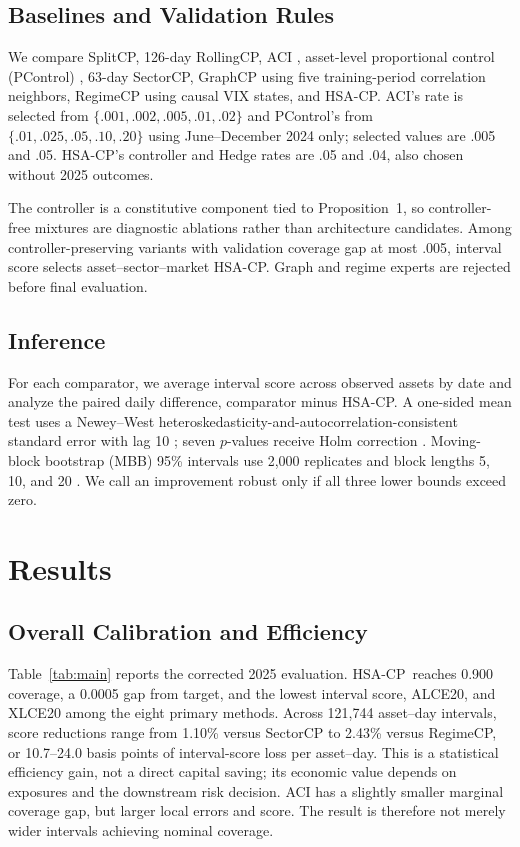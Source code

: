 \documentclass[conference]{IEEEtran}
\newcommand{\method}{HSA-CP}
\begin{document}
\subsection{Baselines and Validation Rules}

We compare SplitCP, 126-day RollingCP, ACI \cite{gibbs2021adaptive}, asset-level proportional control (PControl) \cite{angelopoulos2023pid}, 63-day SectorCP, GraphCP using five training-period correlation neighbors, RegimeCP using causal VIX states, and \method. ACI's rate is selected from $\{.001,.002,.005,.01,.02\}$ and PControl's from $\{.01,.025,.05,.10,.20\}$ using June--December 2024 only; selected values are .005 and .05. \method's controller and Hedge rates are .05 and .04, also chosen without 2025 outcomes.

The controller is a constitutive component tied to Proposition~1, so controller-free mixtures are diagnostic ablations rather than architecture candidates. Among controller-preserving variants with validation coverage gap at most .005, interval score selects asset--sector--market \method. Graph and regime experts are rejected before final evaluation.

\subsection{Inference}

For each comparator, we average interval score across observed assets by date and analyze the paired daily difference, comparator minus \method. A one-sided mean test uses a Newey--West heteroskedasticity-and-autocorrelation-consistent standard error with lag 10 \cite{newey1987simple}; seven $p$-values receive Holm correction \cite{holm1979}. Moving-block bootstrap (MBB) 95\% intervals use 2,000 replicates and block lengths 5, 10, and 20 \cite{kunsch1989bootstrap}. We call an improvement robust only if all three lower bounds exceed zero.

\section{Results}

\subsection{Overall Calibration and Efficiency}

Table~\ref{tab:main} reports the corrected 2025 evaluation. \method\ reaches 0.900 coverage, a 0.0005 gap from target, and the lowest interval score, ALCE20, and XLCE20 among the eight primary methods. Across 121,744 asset--day intervals, score reductions range from 1.10\% versus SectorCP to 2.43\% versus RegimeCP, or 10.7--24.0 basis points of interval-score loss per asset--day. This is a statistical efficiency gain, not a direct capital saving; its economic value depends on exposures and the downstream risk decision. ACI has a slightly smaller marginal coverage gap, but larger local errors and score. The result is therefore not merely wider intervals achieving nominal coverage.
\end{document}
